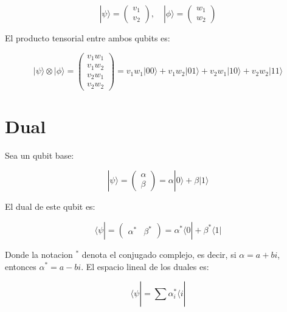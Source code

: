 \documentclass[11pt]{article}
\begin{document}
\begin{equation}
    |\psi\rangle = \begin{pmatrix} v_1 \\ v_2 \end{pmatrix}, \quad |\phi\rangle = \begin{pmatrix} w_1 \\ w_2 \end{pmatrix}
\end{equation}

El producto tensorial entre ambos qubits es:

\begin{equation}
    |\psi\rangle \otimes |\phi\rangle = \begin{pmatrix} v_1 w_1 \\ v_1 w_2 \\ v_2 w_1 \\ v_2 w_2 \end{pmatrix} = v_1 w_1 |00\rangle + v_1 w_2 |01\rangle + v_2 w_1 |10\rangle + v_2 w_2 |11\rangle
\end{equation}

\section{Dual}

Sea un qubit base:

\begin{equation}
    |\psi\rangle = \begin{pmatrix} \alpha \\ \beta \end{pmatrix} = \alpha |0\rangle + \beta |1\rangle
\end{equation}

El dual de este qubit es:

\begin{equation}
    \langle \psi | = \begin{pmatrix} \alpha^* & \beta^* \end{pmatrix} = \alpha^* \langle 0| + \beta^* \langle 1|
\end{equation}

Donde la notacion $^*$ denota el conjugado complejo, es decir, si $\alpha = a + bi$, entonces $\alpha^* = a - bi$. El espacio lineal de los duales es:

\begin{equation}
    \langle \psi | = \sum_{}^{} \alpha_i^* \langle i |
\end{equation}
\end{document}
